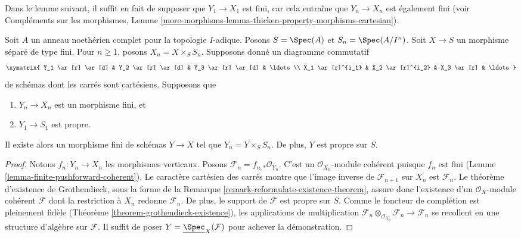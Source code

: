 \noindent
Dans le lemme suivant, il suffit en fait de supposer que $Y_1 \to X_1$ est
fini, car cela entraîne que $Y_n \to X_n$ est également fini (voir
Compléments sur les morphismes, Lemme
\ref{more-morphisms-lemma-thicken-property-morphisms-cartesian}).

\begin{lemma}
\label{lemma-algebraize-formal-scheme-finite-over-proper}
Soit $A$ un anneau noethérien complet pour la topologie $I$-adique.
Posons $S = \Spec(A)$ et $S_n = \Spec(A/I^n)$.
Soit $X \to S$ un morphisme séparé de type fini.
Pour $n \geq 1$, posons $X_n = X \times_S S_n$.
Supposons donné un diagramme commutatif
$$
\xymatrix{
Y_1 \ar[r] \ar[d] & Y_2 \ar[r] \ar[d] & Y_3 \ar[r] \ar[d] & \ldots \\
X_1 \ar[r]^{i_1} & X_2 \ar[r]^{i_2} & X_3 \ar[r] & \ldots
}
$$
de schémas dont les carrés sont cartésiens. Supposons que
\begin{enumerate}
\item $Y_n \to X_n$ est un morphisme fini, et
\item $Y_1 \to S_1$ est propre.
\end{enumerate}
Il existe alors un morphisme fini de schémas $Y \to X$ tel que
$Y_n = Y \times_S S_n$. De plus, $Y$ est propre sur $S$.
\end{lemma}

\begin{proof}
Notons $f_n : Y_n \to X_n$ les morphismes verticaux. Posons
$\mathcal{F}_n = f_{n, *}\mathcal{O}_{Y_n}$. C'est un
$\mathcal{O}_{X_n}$-module cohérent puisque $f_n$ est fini (Lemme
\ref{lemma-finite-pushforward-coherent}). Le caractère cartésien des carrés
montre que l'image inverse de $\mathcal{F}_{n + 1}$ sur $X_n$ est
$\mathcal{F}_n$. Le théorème d'existence de Grothendieck, sous la forme de la
Remarque \ref{remark-reformulate-existence-theorem}, assure donc l'existence
d'un $\mathcal{O}_X$-module cohérent $\mathcal{F}$ dont la restriction à
$X_n$ redonne $\mathcal{F}_n$. De plus, le support de $\mathcal{F}$ est
propre sur $S$. Comme le foncteur de complétion est pleinement fidèle
(Théorème \ref{theorem-grothendieck-existence}), les applications de
multiplication
$\mathcal{F}_n \otimes_{\mathcal{O}_{X_n}} \mathcal{F}_n \to
\mathcal{F}_n$ se recollent en une structure d'algèbre sur $\mathcal{F}$.
Il suffit de poser $Y = \underline{\Spec}_X(\mathcal{F})$ pour achever la
démonstration.
\end{proof}

